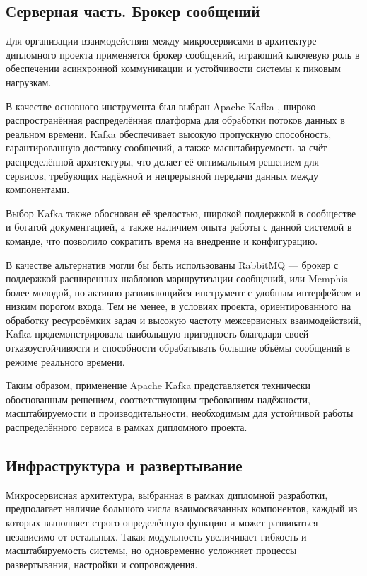 \subsection{Серверная часть. Брокер сообщений}

Для организации взаимодействия между микросервисами
в архитектуре дипломного проекта применяется брокер сообщений,
играющий ключевую роль в обеспечении асинхронной коммуникации
и устойчивости системы к пиковым нагрузкам.

В качестве основного инструмента был выбран Apache Kafka \cite{ApacheKafka},
широко распространённая распределённая платформа
для обработки потоков данных в реальном времени.
Kafka обеспечивает высокую пропускную способность,
гарантированную доставку сообщений,
а также масштабируемость за счёт распределённой архитектуры,
что делает её оптимальным решением для сервисов,
требующих надёжной и непрерывной передачи данных между компонентами.

Выбор Kafka также обоснован её зрелостью,
широкой поддержкой в сообществе и богатой документацией,
а также наличием опыта работы с данной системой в команде,
что позволило сократить время на внедрение и конфигурацию.

В качестве альтернатив могли бы быть использованы
RabbitMQ — брокер с поддержкой расширенных шаблонов маршрутизации сообщений,
или Memphis — более молодой, но активно развивающийся инструмент
с удобным интерфейсом и низким порогом входа.
Тем не менее, в условиях проекта, ориентированного на
обработку ресурсоёмких задач и высокую частоту межсервисных взаимодействий,
Kafka продемонстрировала наибольшую пригодность благодаря своей отказоустойчивости
и способности обрабатывать большие объёмы сообщений в режиме реального времени.

Таким образом, применение Apache Kafka
представляется технически обоснованным решением,
соответствующим требованиям надёжности, масштабируемости и производительности,
необходимым для устойчивой работы распределённого сервиса
в рамках дипломного проекта.

\subsection{Инфраструктура и развертывание}

Микросервисная архитектура, выбранная в рамках дипломной разработки,
предполагает наличие большого числа взаимосвязанных компонентов,
каждый из которых выполняет строго определённую функцию
и может развиваться независимо от остальных.
Такая модульность увеличивает гибкость и масштабируемость системы,
но одновременно усложняет процессы развертывания, настройки и сопровождения.

